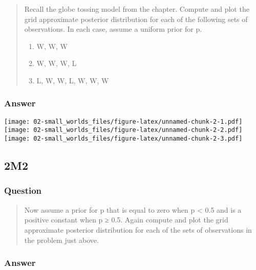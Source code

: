 \documentclass[
]{book}
\providecommand{\tightlist}{%
  \setlength{\itemsep}{0pt}\setlength{\parskip}{0pt}}
\begin{document}
\begin{quote}
Recall the globe tossing model from the chapter. Compute and plot the grid approximate posterior distribution for each of the following sets of observations. In each case, assume a uniform prior for p.~

\begin{enumerate}
\def\labelenumi{(\arabic{enumi})}
\tightlist
\item
  W, W, W
\item
  W, W, W, L
\item
  L, W, W, L, W, W, W
\end{enumerate}
\end{quote}

\hypertarget{answer-4}{%
\subsubsection*{Answer}\label{answer-4}}

\texttt{[image: 02-small\_worlds\_files/figure-latex/unnamed-chunk-2-1.pdf]} \texttt{[image: 02-small\_worlds\_files/figure-latex/unnamed-chunk-2-2.pdf]} \texttt{[image: 02-small\_worlds\_files/figure-latex/unnamed-chunk-2-3.pdf]}

\hypertarget{m2}{%
\subsection*{2M2}\label{m2}}

\hypertarget{question-5}{%
\subsubsection*{Question}\label{question-5}}

\begin{quote}
Now assume a prior for p that is equal to zero when p \textless{} 0.5 and is a positive constant when p ≥ 0.5. Again compute and plot the grid approximate posterior distribution for each of the sets of observations in the problem just above.
\end{quote}

\hypertarget{answer-5}{%
\subsubsection*{Answer}\label{answer-5}}
\end{document}
